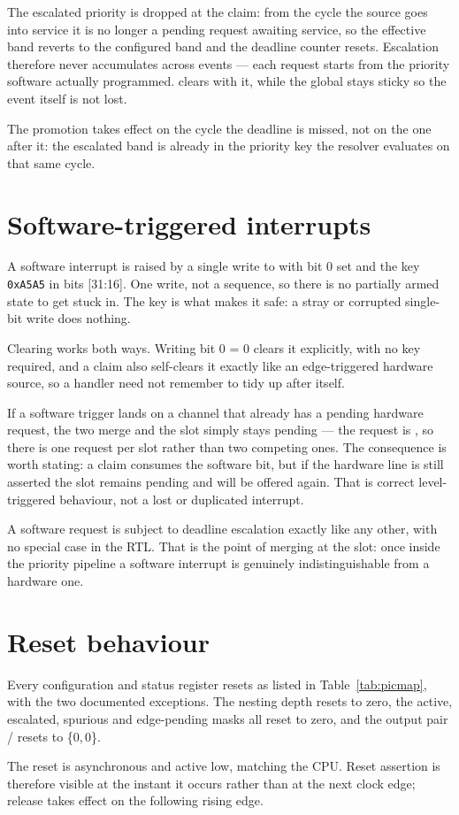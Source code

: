The escalated priority is dropped at the claim: from the cycle the source goes
into service it is no longer a pending request awaiting service, so the
effective band reverts to the configured band and the deadline counter resets.
Escalation therefore never accumulates across events --- each request starts
from the priority software actually programmed.
 clears with it, while the global 
stays sticky so the event itself is not lost.

The promotion takes effect on the cycle the deadline is missed, not on the one
after it: the escalated band is already in the priority key the resolver
evaluates on that same cycle.

\section{Software-triggered interrupts}

A software interrupt is raised by a single write to  with bit
0 set and the key \texttt{0xA5A5} in bits [31:16]. One write, not a sequence, so
there is no partially armed state to get stuck in. The key is what makes it safe:
a stray or corrupted single-bit write does nothing.

Clearing works both ways. Writing bit 0 = 0 clears it explicitly, with no key
required, and a claim also self-clears it exactly like an edge-triggered hardware
source, so a handler need not remember to tidy up after itself.

If a software trigger lands on a channel that already has a pending hardware
request, the two merge and the slot simply stays pending --- the request is
, so there is one request per slot rather
than two competing ones. The consequence is worth stating: a claim consumes the
software bit, but if the hardware line is still asserted the slot remains pending
and will be offered again. That is correct level-triggered behaviour, not a lost
or duplicated interrupt.

A software request is subject to deadline escalation exactly like any other, with
no special case in the RTL. That is the point of merging at the slot: once inside
the priority pipeline a software interrupt is genuinely indistinguishable from a
hardware one.

\section{Reset behaviour}

Every configuration and status register resets as listed in
Table~\ref{tab:picmap}, with the two documented exceptions. The nesting depth
resets to zero, the active, escalated, spurious and edge-pending masks all reset
to zero, and the output pair  /  resets to
\{0,\,0\}.

The reset is asynchronous and active low, matching the CPU. Reset assertion is
therefore visible at the instant it occurs rather than at the next clock edge;
release takes effect on the following rising edge.
